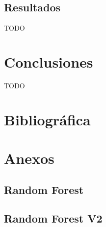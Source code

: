 \documentclass[10pt,a4paper,oneside]{book}
\begin{document}
\newpage
\section{Resultados}
TODO

\newpage
\chapter{Conclusiones}
TODO

\chapter{Bibliográfica}

\cleardoublepage
{}
{}
\listoffigures

\chapter{Anexos}

\section{Random Forest}



\section{Random Forest V2 }


\end{document}
